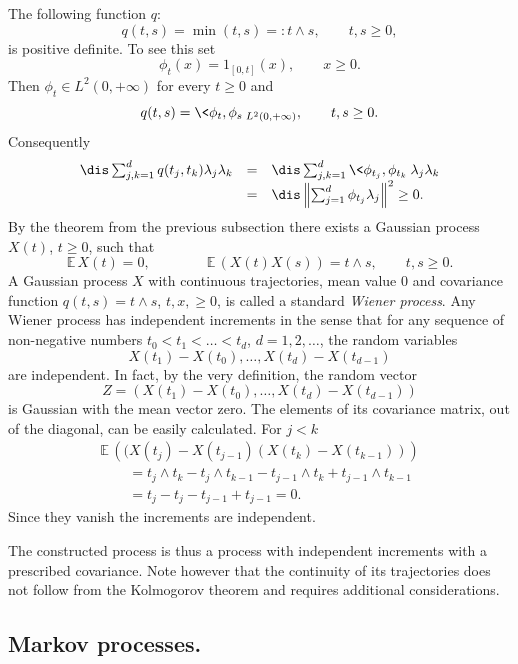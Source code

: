 \documentclass[preprint]{imsart}
\def\E{\mathbb E}
\begin{document}
{The following function $q$:
$$
q(t,s)=\min (t,s)=: t\wedge s,\qquad t,s\geq 0,
$$
is positive definite. To see this set
$$
\phi_t(x)= 1_{[0,t]}(x), \qquad x\geq0 .
$$
Then $\phi_t\in L^2(0,+\infty)$ for every $t\geq 0$ and
$$
q(t,s)=\< \phi_t,\phi_s\>_{ L^2(0,+\infty)},\qquad t,s\geq 0.
$$
Consequently
$$\begin{array}{lll}\dis
\sum_{j,k=1}^{d}q(t_j,t_k)\lambda_j\lambda_k
&=&\dis
\sum_{j,k=1}^{d}\<\phi_{t_j},\phi_{t_k}\>\lambda_j\lambda_k
\\
&=&\dis
\left\|\sum_{j=1}^{d}\phi_{t_j}\lambda_j\right\|^2\geq 0.
\end{array}
$$
By the theorem from
the previous subsection there exists a Gaussian process $X(t)$,
$t\geq 0$, such that
$$
\E\,X(t)=0,\qquad\qquad \E\, (X(t)X(s))=t\wedge s,\qquad t,s\geq
0.
$$
A Gaussian process $X$ with continuous trajectories,
mean value $0$ and covariance function $q(t,s)=t\wedge s$,
$t,x,\geq 0$, is called a standard   {\em Wiener process}. Any Wiener process has independent increments
in the sense that for any sequence of non-negative
numbers $t_0<t_1<\ldots<t_d$, $d=1,2,\ldots$, the random
variables
$$
X(t_1)-X(t_0),\ldots ,X(t_d)-X(t_{d-1})
$$
are independent. In fact, by the very definition,  the random vector
$$
Z=(X(t_1)-X(t_0),\ldots ,X(t_d)-X(t_{d-1}))
$$
is Gaussian with the mean vector zero. The elements of its
covariance matrix, out of the diagonal, can be easily calculated.
For $j<k$
$$
\begin{array}{l}
\E\,\left(
(X(t_j)-X(t_{j-1})( X(t_k)-X(t_{k-1}))\right)
\\\qquad
=t_j\wedge t_k-t_j\wedge t_{k-1}
-t_{j-1}\wedge t_k +t_{j-1}\wedge t_{k-1}
\\\qquad
=t_j-t_j
-t_{j-1} +t_{j-1}=0.
\end{array}
$$
Since they vanish the increments are independent.
\vspace{2mm}

\noindent The constructed process is thus a process with independent increments with a prescribed covariance.
Note however that the
continuity of its trajectories does not follow from the Kolmogorov
theorem and requires additional considerations.


\subsection{Markov processes.}

}
\end{document}
